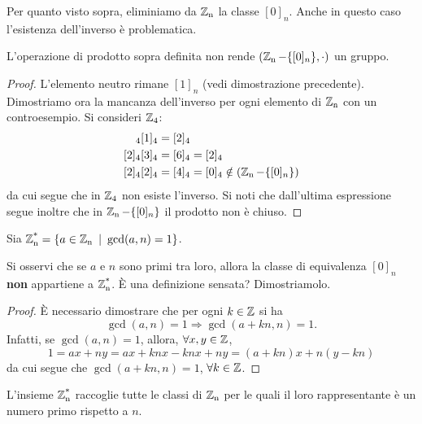Per quanto visto sopra, eliminiamo da $\operatorname*{\mathbb{Z}_n}$ la classe $[0]_n$. Anche in questo caso l'esistenza dell'inverso è problematica.

\begin{proposizione}
L'operazione di prodotto sopra definita non rende $(\operatorname*{\mathbb{Z}_n} - \{[0]_n\}, \cdot)$ un gruppo.
\end{proposizione}
\begin{proof}
L'elemento neutro rimane $[1]_n$ (vedi dimostrazione precedente). Dimostriamo ora la mancanza dell'inverso per ogni elemento di $\operatorname*{\mathbb{Z}_n}$ con un controesempio. Si consideri $\operatorname*{\mathbb{Z}}_4$:
\begin{align*}
[2]_4[1]_4&=[2]_4 \\
[2]_4[3]_4&=[6]_4=[2]_4 \\
[2]_4[2]_4&=[4]_4=[0]_4 \notin (\Zn - \{[0]_n\})
\end{align*}
da cui segue che in $\operatorname*{\mathbb{Z}}_4$ non esiste l'inverso. Si noti che dall'ultima espressione segue inoltre che in $\operatorname*{\mathbb{Z}_n} - \{[0]_n\}$ il prodotto non è chiuso.
\end{proof}

\begin{definizione}
Sia $\operatorname*{\mathbb{Z}_n^*}=\{a\in\operatorname*{\mathbb{Z}_n} \ | \ \gcd(a,n)=1 \}$.
\end{definizione}
Si osservi che se $a$ e $n$ sono primi tra loro, allora la classe di equivalenza $[0]_n$ \textbf{non} appartiene a $\operatorname*{\mathbb{Z}_n^*}$.
È una definizione sensata? Dimostriamolo.
\begin{proof}
È necessario dimostrare che per ogni $k\in\operatorname*{\mathbb{Z}}$ si ha 
\[
\gcd(a,n)=1 \Rightarrow \gcd(a+kn,n)=1.
\] 
Infatti, se $\gcd(a,n)=1$, allora, $\forall x,y\in\operatorname*{\mathbb{Z}}$,
\[
1=ax+ny=ax+knx-knx+ny=(a+kn)x+n(y-kn)
\]
da cui segue che $\gcd(a+kn,n)=1$, $\forall k\in\operatorname*{\mathbb{Z}}$.
\end{proof}

L'insieme $\operatorname*{\mathbb{Z}_n^*}$ raccoglie tutte le classi di $\operatorname*{\mathbb{Z}_n}$ per le quali il loro rappresentante è un numero primo rispetto a $n$.


